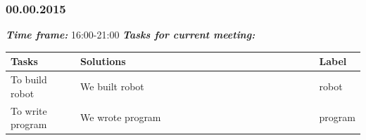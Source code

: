 \subsubsection{00.00.2015}
	\textit{\textbf{Time frame:}} 16:00-21:00 \newline \newline
	\textit{\textbf{Tasks for current meeting:}}

  \begin{table}[H]
	\vspace{-2mm}
	\begin{center}
		\begin{tabular}{|p{0.2\linewidth}|p{0.7\linewidth}|p{0.1\linewidth}|}
			\hline
			Tasks & Solutions & Label \\
			\hline
			To build robot & We built robot & robot \\
			\hline
			To write program & We wrote program & program \\
			\hline
		\end{tabular}
	\end{center}
  \end{table}
  
